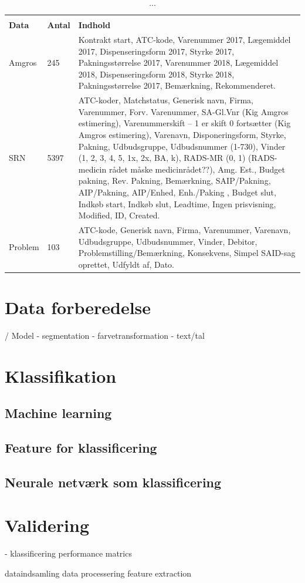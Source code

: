 \vspace{2mm}
\begin{longtable}{p{2.5cm}|p{1cm}|p{11cm}}
	\caption{...}
	\vspace{2mm}
	\label{table:XXX} \\
\cellcolor[HTML]{C0C0C0} {\textbf{Data}} & {\cellcolor[HTML]{C0C0C0}\textbf{Antal}} & 
{\cellcolor[HTML]{C0C0C0}\textbf{Indhold}} \\ \hline
Amgros & 245 & Kontrakt start, ATC-kode, Varenummer 2017, Lægemiddel 2017, Dispenseringsform 2017, Styrke 2017, Pakningsstørrelse 2017, Varenummer 2018, Lægemiddel 2018, Dispenseringsform 2018, Styrke 2018, Pakningsstørrelse 2017, Bemærkning, Rekommenderet.\\ \hline
SRN & 5397 & ATC-koder, Matchstatus, Generisk navn, Firma, Varenummer, Forv. Varenummer, SA-Gl.Vnr (Kig Amgros estimering), Varenummerskift – 1 er skift 0 fortsætter (Kig Amgros estimering), Varenavn, Disponeringsform, Styrke, Pakning, Udbudsgruppe, Udbudsnummer (1-730), Vinder (1, 2, 3, 4, 5, 1x, 2x, BA, k), RADS-MR (0, 1) (RADS- medicin rådet måske medicinrådet??), Amg. Est., Budget pakning, Rev. Pakning, Bemærkning, SAIP/Pakning, AIP/Pakning,
AIP/Enhed, Enh./Paking , Budget slut, Indkøb start, Indkøb slut, Leadtime, Ingen prisvisning, Modified, ID, Created.\\ \hline
Problem & 103 & ATC-kode, Generisk navn, Firma, Varenummer, Varenavn, Udbudsgruppe, Udbudsnummer, Vinder, Debitor, Problemstilling/Bemærkning, Konsekvens, Simpel SAID-sag oprettet, Udfyldt af, Dato. \\ \hline
\end{longtable}







\section{Data forberedelse} / Model
- segmentation
- farvetransformation - text/tal

\section{Klassifikation}
\subsection{Machine learning}
\subsection{Feature for klassificering}
\subsection{Neurale netværk som klassificering}

\section{Validering}
- klassificering performance matrics 


dataindsamling
data processering 
feature extraction 